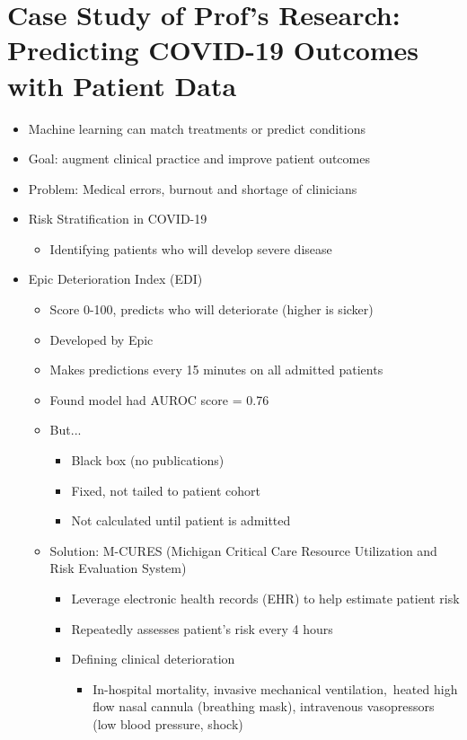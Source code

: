 \documentclass[10pt, oneside]{article}
\begin{document}
\section{Case Study of Prof's Research: Predicting COVID-19 Outcomes with Patient Data}
\begin{itemize}
    \item Machine learning can match treatments or predict conditions
    \item Goal: augment clinical practice and improve patient outcomes
    \item Problem: Medical errors, burnout and shortage of clinicians
    \item Risk Stratification in COVID-19
    \begin{itemize}
        \item Identifying patients who will develop severe disease
    \end{itemize}
    \item Epic Deterioration Index (EDI) 
    \begin{itemize}
        \item Score 0-100, predicts who will deteriorate (higher is sicker)
        \item Developed by Epic
        \item Makes predictions every 15 minutes on all admitted patients
        \item Found model had AUROC score = 0.76
        \item But...
        \begin{itemize}
            \item Black box (no publications)
            \item Fixed, not tailed to patient cohort
            \item Not calculated until patient is admitted
        \end{itemize}
        \item Solution: M-CURES (Michigan Critical Care Resource Utilization and Risk Evaluation System)
        \begin{itemize}
            \item Leverage electronic health records (EHR) to help estimate patient risk
            \item Repeatedly assesses patient's risk every 4 hours
            \item Defining clinical deterioration
            \begin{itemize}
                \item In-hospital mortality, invasive mechanical ventilation, heated high flow nasal cannula (breathing mask), intravenous vasopressors (low blood pressure, shock)

\end{itemize}
\end{itemize}
\end{itemize}
\end{itemize}
\end{document}
